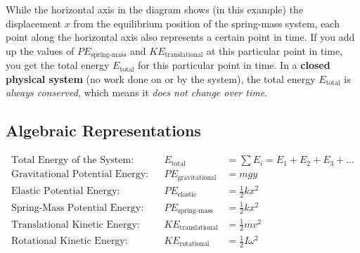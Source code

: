 {\scriptsize{\noindent While the horizontal axis in the diagram shows (in this example) the displacement $x$ from the equilibrium position of the spring-mass system, each point along the horizontal axis also represents a certain point in time. If you add up the values of $PE_\text{spring-mass}$ and $KE_\text{translational}$ at this particular point in time, you get the total energy $E_\text{total}$ for this particular point in time. In a \textbf{closed physical system} (no work done on or by the system), the total energy $E_\text{total}$ is \emph{always conserved}, which means it \emph{does not change over time}.}

\subsection*{Algebraic Representations}

\begin{align*}
	\text{Total Energy of the System:} && E_\text{total} &= \sum E_i = E_1 + E_2 + E_3 + \ldots \\[6mm]
	\text{Gravitational Potential Energy:} && PE_\text{gravitational} &= m g y\\[3mm]
	\text{Elastic Potential Energy:} && PE_\text{elastic} &= \frac{1}{2} k x^2\\[2mm]
	\text{Spring-Mass Potential Energy:} && PE_\text{spring-mass} &= \frac{1}{2} k x^2\\[2mm]
	\text{Translational Kinetic Energy:} && KE_\text{translational} &= \frac{1}{2} m v^2 \\[2mm]
	\text{Rotational Kinetic Energy:} && KE_\text{rotational} &= \frac{1}{2} I \omega^2
\end{align*}
}